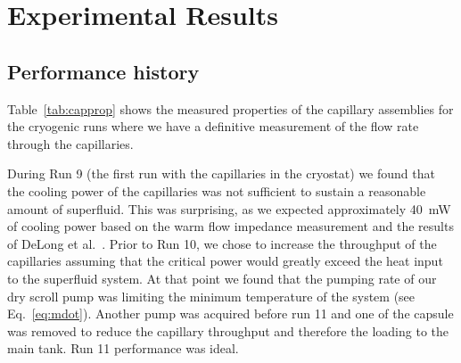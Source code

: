 \documentclass[
12pt, %
letterpaper, %
oneside, %
headinclude, footinclude, %
BCOR5mm, %
]{scrartcl}
\newcommand{\mrm}[1]{\mathrm{#1}}
\begin{document}

 
\section{Experimental Results}


\subsection{Performance history}

Table~\ref{tab:capprop} shows the measured properties of the capillary assemblies for the cryogenic runs where we have a definitive measurement of the flow rate through the capillaries. 

During Run 9 (the first run with the capillaries in the cryostat) we found that the cooling power of the capillaries was not sufficient to sustain a reasonable amount of superfluid. This was surprising, as we expected approximately 40~mW of cooling power based on the warm flow impedance measurement and the results of DeLong et al.\ \cite{Delong1970}. Prior to Run 10, we chose to increase the throughput of the capillaries assuming that the critical power would greatly exceed the heat input to the superfluid system. At that point we found that the pumping rate of our dry scroll pump was limiting the minimum temperature of the system (see Eq.~\ref{eq:mdot}). Another pump was acquired before run 11 and one of the capsule was removed to reduce the capillary throughput and therefore the loading to the main tank. Run 11 performance was ideal.
\end{document}
